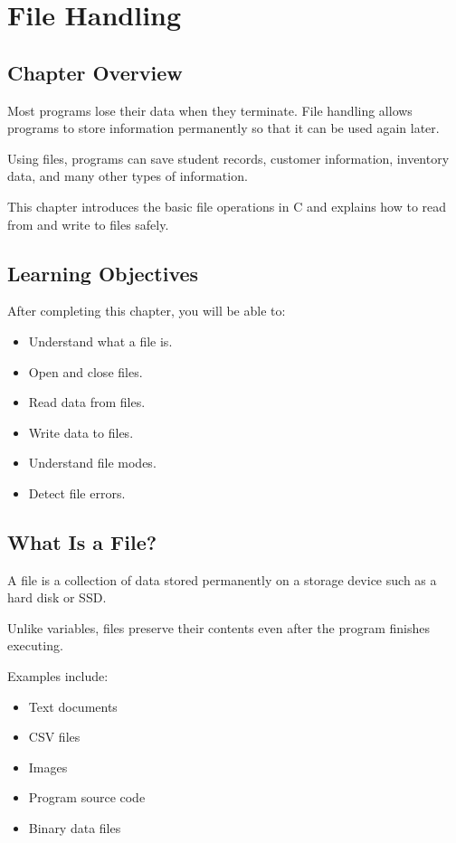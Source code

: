 \documentclass[12pt,openany]{book}
\begin{document}
\chapter{File Handling}

\section{Chapter Overview}

Most programs lose their data when they terminate. File handling allows programs to store information permanently so that it can be used again later.

Using files, programs can save student records, customer information, inventory data, and many other types of information.

This chapter introduces the basic file operations in C and explains how to read from and write to files safely.

\section{Learning Objectives}

After completing this chapter, you will be able to:

\begin{itemize}
    \item Understand what a file is.
    \item Open and close files.
    \item Read data from files.
    \item Write data to files.
    \item Understand file modes.
    \item Detect file errors.
\end{itemize}

\section{What Is a File?}

A file is a collection of data stored permanently on a storage device such as a hard disk or SSD.

Unlike variables, files preserve their contents even after the program finishes executing.

Examples include:

\begin{itemize}
    \item Text documents
    \item CSV files
    \item Images
    \item Program source code
    \item Binary data files
\end{itemize}
\end{document}
